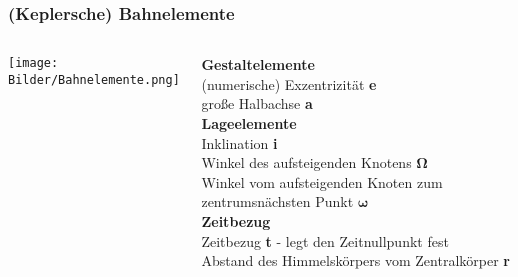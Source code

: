\documentclass{beamer}
\begin{document}
\begin{frame}\frametitle{(Keplersche) Bahnelemente}

\begin{columns}

\begin{column}{.48\textwidth}

\texttt{[image: Bilder/Bahnelemente.png]}

\end{column}

\hfill

\begin{column}{.48\textwidth}

\textbf{Gestaltelemente}\\[.1cm]

\tiny
(numerische) Exzentrizität \textbf{e}\\[.1cm]
große Halbachse \textbf{a}\\[.5cm]

\small
\textbf{Lageelemente}\\[.1cm]

\tiny
Inklination \textbf{i}\\[.1cm]
Winkel des aufsteigenden Knotens $\boldsymbol{\Omega}$\\[.1cm]
Winkel vom aufsteigenden Knoten zum zentrumsnächsten Punkt $\boldsymbol{\omega}$\\[.5cm]

\small
\textbf{Zeitbezug}\\[.1cm]

\tiny
Zeitbezug \textbf{t} - legt den Zeitnullpunkt fest\\[.1cm]
Abstand des Himmelskörpers vom Zentralkörper \textbf{r}

\end{column}

\end{columns}

\end{frame}
\end{document}
